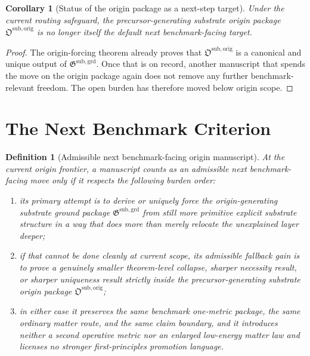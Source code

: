 \documentclass[11pt]{article}
\newcommand{\OriginPackage}{\mathfrak O^{\mathrm{sub,orig}}}
\newcommand{\GroundPackage}{\mathfrak G^{\mathrm{sub,grd}}}
\newtheorem{definition}{Definition}
\newtheorem{corollary}{Corollary}
\begin{document}
\begin{corollary}[Status of the origin package as a next-step target]
Under the current routing safeguard, the precursor-generating substrate origin package \(\OriginPackage\) is no longer itself the default next benchmark-facing target.
\end{corollary}

\begin{proof}
The origin-forcing theorem already proves that \(\OriginPackage\) is a canonical and unique output of \(\GroundPackage\). Once that is on record, another manuscript that spends the move on the origin package again does not remove any further benchmark-relevant freedom. The open burden has therefore moved below origin scope.
\end{proof}

\section{The Next Benchmark Criterion}

\begin{definition}[Admissible next benchmark-facing origin manuscript]
At the current origin frontier, a manuscript counts as an admissible next benchmark-facing move only if it respects the following burden order:
\begin{enumerate}
    \item its primary attempt is to derive or uniquely force the origin-generating substrate ground package \(\GroundPackage\) from still more primitive explicit substrate structure in a way that does more than merely relocate the unexplained layer deeper;
    \item if that cannot be done cleanly at current scope, its admissible fallback gain is to prove a genuinely smaller theorem-level collapse, sharper necessity result, or sharper uniqueness result strictly inside the precursor-generating substrate origin package \(\OriginPackage\);
    \item in either case it preserves the same benchmark one-metric package, the same ordinary matter route, and the same claim boundary, and it introduces neither a second operative metric nor an enlarged low-energy matter law and licenses no stronger first-principles promotion language.
\end{enumerate}
\end{definition}
\end{document}
